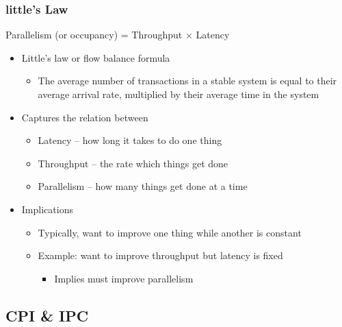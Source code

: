 \documentclass[12pt]{article}
\begin{document}
            \subsubsection{little’s Law}
                Parallelism (or occupancy) = Throughput × Latency
                \begin{itemize}
                    \item {Little’s law or flow balance formula}
                        \begin{itemize}
                            \item {The average number of transactions in a stable system is equal to their average arrival rate, multiplied by their average time in the system}
                        \end{itemize}
                    \item {Captures the relation between}
                        \begin{itemize}
                            \item {Latency – how long it takes to do one thing}
                            \item {Throughput – the rate which things get done}
                            \item {Parallelism – how many things get done at a time}
                        \end{itemize}
                    \item {Implications}
                        \begin{itemize}
                            \item {Typically, want to improve one thing while another is constant}
                            \item {Example: want to improve throughput but latency is fixed}
                                \begin{itemize}
                                    \item {Implies must improve parallelism}
                                \end{itemize}
                        \end{itemize}
                \end{itemize}
        \subsection{CPI \& IPC}
\end{document}
